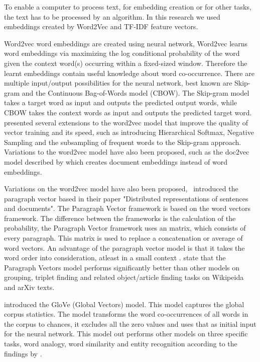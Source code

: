 \documentclass[../../Thesis.tex]{subfiles}
\begin{document}
To enable a computer to process text, for embedding creation or for other tasks, the text has to be processed by an algorithm. In this research we used embeddings created by Word2Vec and TF-IDF feature vectors.
\begin{jumpin}
Word2vec word embeddings are created using neural network, Word2vec learns word embeddings via maximizing the log conditional probability of the word given the context word(s) occurring within a fixed-sized window. Therefore the learnt embeddings contain useful knowledge about word co-occurrence\cite{nalisnick2016improving}. There are multiple input/output possibilities for the neural network, best known are Skip-gram and the Continuous Bag-of-Words model (CBOW). The Skip-gram model takes a target word as input and outputs the predicted output words, while CBOW takes the context words as input and outputs the predicted target word\cite{nalisnick2016improving, pennington2014glove}. \citet{mikolov2013distributed}\cite{mikolov2013efficient} presented several extensions to the word2vec model that improve the quality of vector training and its speed, such as introducing Hierarchical Softmax, Negative Sampling and the subsampling of frequent words to the Skip-gram approach. Variations to the word2vec model have also been proposed, such as the doc2vec model described by \citet{lau2016empirical} which creates document embeddings instead of word embeddings.

Variations on the word2vec model have also been proposed,~\citet{le2014distributed} introduced the paragraph vector based in their paper "Distributed representations of sentences and documents". The Paragraph Vector framework is based on the word vectors framework. The difference between the frameworks is the calculation of the probability, the Paragraph Vector framework uses an matrix, which consists of every paragraph. This matrix is used to replace a concatenation or average of word vectors. An advantage of the paragraph vector model is that it takes the word order into consideration, atleast in a small context \cite{le2014distributed}. \citet{dai2015document} state that the Paragraph Vectors model performs significantly better than other models on grouping, triplet finding and related object/article finding tasks on Wikipeida and arXiv texts.

\citet{pennington2014glove} introduced the GloVe (Global Vectors) model. This model captures the global corpus statistics. The model transforms the word co-occurrences of all words in the corpus to chances, it excludes all the zero values and uses that as initial input for the neural network. This model out performs other models on three specific tasks, word analogy, word similarity and entity recognition according to the findings by \citet{pennington2014glove}.\\


\end{jumpin}
\end{document}
